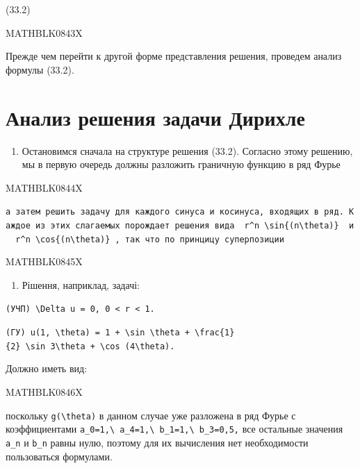 \documentclass[
  ukrainian,
]{article}
\providecommand{\tightlist}{%
  \setlength{\itemsep}{0pt}\setlength{\parskip}{0pt}}
\begin{document}
(33.2)

MATHBLK0843X

Прежде чем перейти к другой форме представления решения, проведем анализ
формулы (33.2).

\section{Анализ решения задачи
Дирихле}\label{ux430ux43dux430ux43bux438ux437-ux440ux435ux448ux435ux43dux438ux44f-ux437ux430ux434ux430ux447ux438-ux434ux438ux440ux438ux445ux43bux435}

\begin{enumerate}
\def\labelenumi{\arabic{enumi}.}
\tightlist
\item
  Остановимся сначала на структуре решения (33.2). Согласно этому
  решению, мы в первую очередь должны разложить граничную функцию в ряд
  Фурье
\end{enumerate}

MATHBLK0844X

\texttt{а\ затем\ решить\ задачу\ для\ каждого\ синуса\ и\ косинуса,\ входящих\ в\ ряд.\ Каждое\ из\ этих\ слагаемых\ порождает\ решения\ вида\ \ \textquotesingle{}r\^{}n\ \textbackslash{}sin\{(n\textbackslash{}theta)\}\textquotesingle{}\ \ и\ \ \textquotesingle{}r\^{}n\ \textbackslash{}cos\{(n\textbackslash{}theta)\}\textquotesingle{}\ ,\ так\ что\ по\ принцицу\ суперпозиции}

MATHBLK0845X

\begin{enumerate}
\def\labelenumi{\arabic{enumi}.}
\setcounter{enumi}{1}
\tightlist
\item
  Рішення, наприклад, задачі:
\end{enumerate}

\texttt{(УЧП)\ \textquotesingle{}\textbackslash{}Delta\ u\ =\ 0\textquotesingle{},\ \textquotesingle{}0\ \textless{}\ r\ \textless{}\ 1\textquotesingle{}.}

\texttt{(ГУ)\ \textquotesingle{}u(1,\ \textbackslash{}theta)\ =\ 1\ +\ \textbackslash{}sin\ \textbackslash{}theta\ +\ \textbackslash{}frac\{1\}\{2\}\ \textbackslash{}sin\ 3\textbackslash{}theta\ +\ \textbackslash{}cos\ (4\textbackslash{}theta)\textquotesingle{}.}

Должно иметь вид:

MATHBLK0846X

поскольку \texttt{g(\textbackslash{}theta)} в данном случае уже
разложена в ряд Фурье с коэффициентами
\texttt{a\_0=1,\textbackslash{}\ a\_4=1,\textbackslash{}\ b\_1=1,\textbackslash{}\ b\_3=0,5,}
все остальные значения \texttt{a\_n} и \texttt{b\_n} равны нулю, поэтому
для их вычисления нет необходимости пользоваться формулами.
\end{document}
